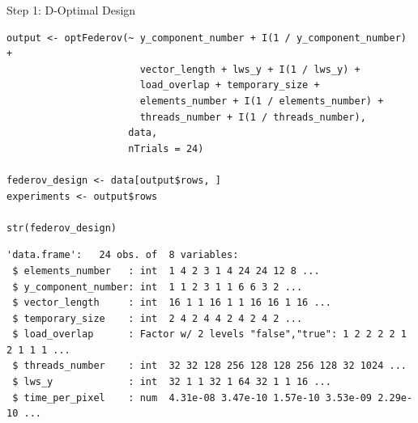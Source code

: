 \documentclass[10pt, compress, aspectratio=169, xcolor={table,usenames,dvipsnames}]{beamer}
\begin{document}
\begin{frame}[fragile,label={sec:orge77077e}]{Step 1: D-Optimal Design}
 \scriptsize
\lstset{language=r,label= ,caption= ,captionpos=b,numbers=none}
\begin{lstlisting}
output <- optFederov(~ y_component_number + I(1 / y_component_number) +
                       vector_length + lws_y + I(1 / lws_y) +
                       load_overlap + temporary_size +
                       elements_number + I(1 / elements_number) +
                       threads_number + I(1 / threads_number),
                     data,
                     nTrials = 24)

federov_design <- data[output$rows, ]
experiments <- output$rows

str(federov_design)
\end{lstlisting}

\begin{verbatim}
'data.frame':	24 obs. of  8 variables:
 $ elements_number   : int  1 4 2 3 1 4 24 24 12 8 ...
 $ y_component_number: int  1 1 2 3 1 1 6 6 3 2 ...
 $ vector_length     : int  16 1 1 16 1 1 16 16 1 16 ...
 $ temporary_size    : int  2 4 2 4 4 2 4 2 4 2 ...
 $ load_overlap      : Factor w/ 2 levels "false","true": 1 2 2 2 2 1 2 1 1 1 ...
 $ threads_number    : int  32 32 128 256 128 128 256 128 32 1024 ...
 $ lws_y             : int  32 1 1 32 1 64 32 1 1 16 ...
 $ time_per_pixel    : num  4.31e-08 3.47e-10 1.57e-10 3.53e-09 2.29e-10 ...
\end{verbatim}

\normalsize
\end{frame}
\end{document}
